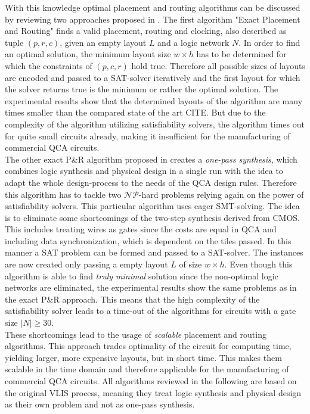 With this knowledge optimal placement and routing algorithms can be discussed by reviewing two approaches proposed in \cite{Walter}. The first algorithm "Exact Placement and Routing" finds a valid placement, routing and clocking, also described as tuple $(p, r, c)$, given an empty layout $L$ and a logic network $N$. In order to find an optimal solution, the minimum layout size $w \times h$
has to be determined for which the constraints of $(p, c, r)$ hold true. Therefore all possible sizes of layouts are encoded and passed to a SAT-solver iteratively and the first layout for which the solver returns true is the minimum or rather the optimal solution. The experimental results show that the determined layouts of the algorithm are many times smaller than the compared state of the art CITE. But due to the complexity of the algorithm utilizing satisfiability solvers, the algorithm times out for quite small circuits already, making it insufficient for the manufacturing of commercial QCA circuits.\\
The other exact P\&R algorithm proposed in \cite{Walter} creates a \textit{one-pass synthesis}, which combines logic synthesis and physical design in a single run with the idea to adapt the whole design-process to the needs of the QCA design rules. Therefore this algorithm has to tackle two $\mathcal{NP}$-hard problems relying again on the power of satisfiability solvers. This particular algorithm uses eager SMT-solving. The idea is to eliminate some shortcomings of the two-step synthesis derived from CMOS. This includes treating wires as gates since the costs are equal in QCA and including data synchronization, which is dependent on the tiles passed. In this manner a SAT problem can be formed and passed to a SAT-solver. The instances are now created only passing a empty layout $L$ of size $w \times h$. Even though this algorithm is able to find \textit{truly minimal} solution since the non-optimal logic networks are eliminated, the experimental results show the same problems as in the exact P\&R approach. This means that the high complexity of the satisfiability solver leads to a time-out of the algorithms for circuits with a gate size $|N| \geq 30$.\\
These shortcomings lead to the usage of \textit{scalable} placement and routing algorithms. This approach trades optimality of the circuit for computing time, yielding larger, more expensive layouts, but in short time. This makes them scalable in the time domain and therefore applicable for the manufacturing of commercial QCA circuits. All algorithms reviewed in the following are based on the original VLIS process, meaning they treat logic synthesis and physical design as their own problem and not as one-pass synthesis.\\
